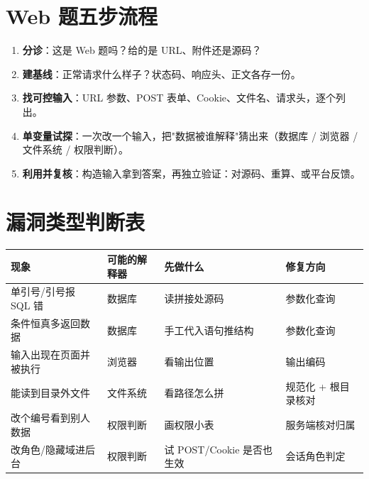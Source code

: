 \documentclass[UTF8,12pt,oneside]{ctexbook}
\begin{document}
\section{Web 题五步流程}
\begin{enumerate}
\item \textbf{分诊}：这是 Web 题吗？给的是 URL、附件还是源码？
\item \textbf{建基线}：正常请求什么样子？状态码、响应头、正文各存一份。
\item \textbf{找可控输入}：URL 参数、POST 表单、Cookie、文件名、请求头，逐个列出。
\item \textbf{单变量试探}：一次改一个输入，把"数据被谁解释"猜出来（数据库 / 浏览器 / 文件系统 / 权限判断）。
\item \textbf{利用并复核}：构造输入拿到答案，再独立验证：对源码、重算、或平台反馈。
\end{enumerate}

\section{漏洞类型判断表}
\begin{center}
\begin{tabular}{p{}p{}p{}p{}}
\toprule
现象 & 可能的解释器 & 先做什么 & 修复方向 \\
\midrule
单引号/引号报 SQL 错 & 数据库 & 读拼接处源码 & 参数化查询 \\
条件恒真多返回数据 & 数据库 & 手工代入语句推结构 & 参数化查询 \\
输入出现在页面并被执行 & 浏览器 & 看输出位置 & 输出编码 \\
能读到目录外文件 & 文件系统 & 看路径怎么拼 & 规范化 + 根目录核对 \\
改个编号看到别人数据 & 权限判断 & 画权限小表 & 服务端核对归属 \\
改角色/隐藏域进后台 & 权限判断 & 试 POST/Cookie 是否也生效 & 会话角色判定 \\
\bottomrule
\end{tabular}
\end{center}
\end{document}
